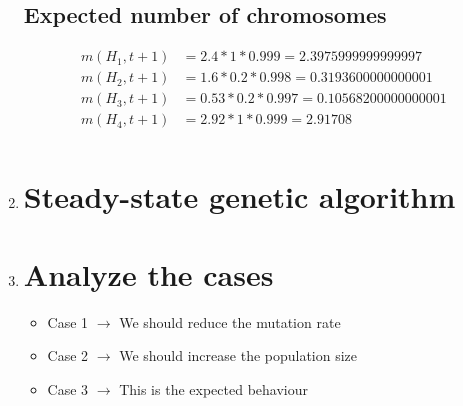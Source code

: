 \documentclass{article}
\begin{document}
\begin{enumerate}
        \subsection*{Expected number of chromosomes}
        \begin{align*}
            m(H_1,t +1) &= 2.4 * 1 * 0.999 = 2.3975999999999997\\
            m(H_2,t +1) &= 1.6 * 0.2 * 0.998 = 0.3193600000000001\\
            m(H_3,t +1) &= 0.53 * 0.2 * 0.997 = 0.10568200000000001\\
            m(H_4,t +1) &= 2.92 * 1 * 0.999 = 2.91708\\
        \end{align*}
    \item \section*{Steady-state genetic algorithm}

    \item \section*{Analyze the cases}
    \begin{itemize}
        \item Case 1 $\rightarrow$ We should reduce the mutation rate
        \item Case 2 $\rightarrow$ We should increase the population size
        \item Case 3 $\rightarrow$ This is the expected behaviour
    \end{itemize}

\end{enumerate}
\end{document}
